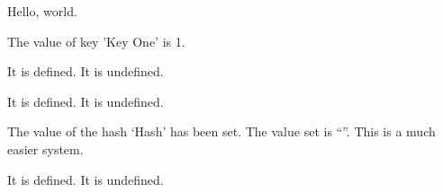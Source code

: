 \documentclass[12pt]{WisconsinThesis}
\begin{document}
    

Hello, world.


 {The value of key 'Key One' is 1.}

    {It is defined.}
    {It is undefined.}


    {It is defined.}
    {It is undefined.}

The value of the hash `Hash' has been set.  The value set is ``''.  This is a much easier system.




    {It is defined.}
    {It is undefined.}

%
%
%
%
%
\end{document}
